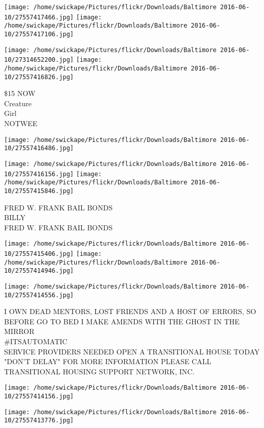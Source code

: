 \documentclass[10pt,letterpaper]{article}
\begin{document}
\texttt{[image: /home/swickape/Pictures/flickr/Downloads/Baltimore 2016-06-10/27557417466.jpg]}
\texttt{[image: /home/swickape/Pictures/flickr/Downloads/Baltimore 2016-06-10/27557417106.jpg]}

\texttt{[image: /home/swickape/Pictures/flickr/Downloads/Baltimore 2016-06-10/27314652200.jpg]}
\texttt{[image: /home/swickape/Pictures/flickr/Downloads/Baltimore 2016-06-10/27557416826.jpg]}

\$15 NOW\\
Creature\\
Girl\\
NOTWEE\\
\pagebreak

\texttt{[image: /home/swickape/Pictures/flickr/Downloads/Baltimore 2016-06-10/27557416486.jpg]}

\vspace{0.25in}
\texttt{[image: /home/swickape/Pictures/flickr/Downloads/Baltimore 2016-06-10/27557416156.jpg]}
\texttt{[image: /home/swickape/Pictures/flickr/Downloads/Baltimore 2016-06-10/27557415846.jpg]}

FRED W. FRANK BAIL BONDS\\
BILLY\\
FRED W. FRANK BAIL BONDS\\
\pagebreak

\texttt{[image: /home/swickape/Pictures/flickr/Downloads/Baltimore 2016-06-10/27557415406.jpg]}
\texttt{[image: /home/swickape/Pictures/flickr/Downloads/Baltimore 2016-06-10/27557414946.jpg]}

\vspace{0.25in}
\texttt{[image: /home/swickape/Pictures/flickr/Downloads/Baltimore 2016-06-10/27557414556.jpg]}

I OWN DEAD MENTORS, LOST FRIENDS AND A HOST OF ERRORS, SO BEFORE GO TO BED I MAKE AMENDS WITH THE GHOST IN THE MIRROR\\
\#ITSAUTOMATIC\\
SERVICE PROVIDERS NEEDED OPEN A TRANSITIONAL HOUSE TODAY "DON'T DELAY" FOR MORE INFORMATION PLEASE CALL TRANSITIONAL HOUSING SUPPORT NETWORK, INC.\\
\pagebreak

\texttt{[image: /home/swickape/Pictures/flickr/Downloads/Baltimore 2016-06-10/27557414156.jpg]}

\vspace{0.25in}
\texttt{[image: /home/swickape/Pictures/flickr/Downloads/Baltimore 2016-06-10/27557413776.jpg]}
\end{document}
